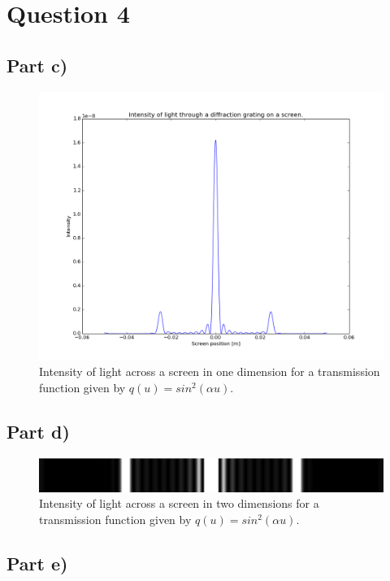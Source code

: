 \documentclass[a4paper,12pt]{article}
\begin{document}
\section{Question 4}

\subsection{Part c)}

\begin{figure}[H]
\centering
\includegraphics[width = \linewidth]{lab2q4c.png}
\caption{Intensity of light across a screen in one dimension for a transmission function given by $q(u) = sin^2(\alpha u)$.}
\label{fig:q4c}
\end{figure}

\subsection{Part d)}

\begin{figure}[H]
\centering
\includegraphics[width = \linewidth]{lab2q4d.png}
\caption{Intensity of light across a screen in two dimensions for a transmission function given by $q(u) = sin^2(\alpha u)$.}
\label{fig:q4d}
\end{figure}

\subsection{Part e)}
\end{document}
